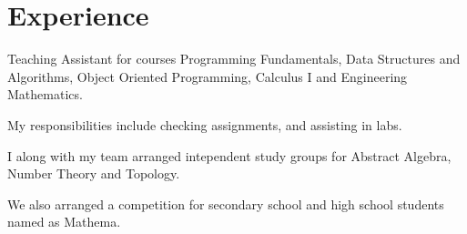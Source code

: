 \documentclass[]{resume}
\begin{document}


%
%

\begin{minipage}[t]{0.5\textwidth}


    \section{Experience}

    \vspace{\topsep} %
    \begin{tightemize}
        \sectionsep
        \item Teaching Assistant for courses Programming Fundamentals, Data Structures and Algorithms, Object Oriented Programming, Calculus I and Engineering Mathematics.
        \item My responsibilities include checking assignments, and assisting in labs.
    \end{tightemize}
    \begin{tightemize}
        \sectionsep
        \item I along with my team arranged intependent study groups for Abstract Algebra, Number Theory and Topology.
        \item We also arranged a competition for secondary school and high school students named as Mathema.
    \end{tightemize}



\end{minipage}
\end{document}
